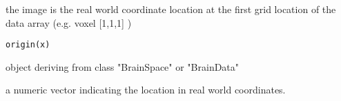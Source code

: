 \begin{Description}\relax
the image is the real world coordinate location at the first grid
location of the data array (e.g. voxel [1,1,1] )
\end{Description}
\begin{Usage}
\begin{verbatim}
origin(x)
\end{verbatim}
\end{Usage}
\begin{Arguments}
\begin{ldescription}
\item[\code{x}] object deriving from class "BrainSpace" or "BrainData" 
\end{ldescription}
\end{Arguments}
\begin{Value}
a numeric vector indicating the location in real world coordinates.
\end{Value}

